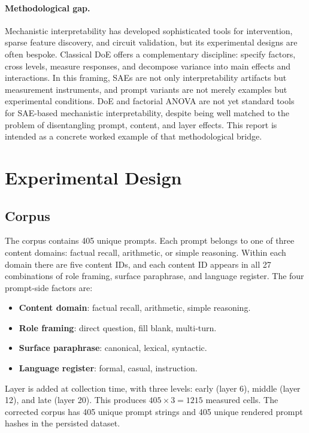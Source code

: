 \documentclass[11pt]{article}
\begin{document}
\paragraph{Methodological gap.}
Mechanistic interpretability has developed sophisticated tools for intervention, sparse feature discovery, and circuit validation, but its experimental designs are often bespoke. Classical DoE offers a complementary discipline: specify factors, cross levels, measure responses, and decompose variance into main effects and interactions. In this framing, SAEs are not only interpretability artifacts but measurement instruments, and prompt variants are not merely examples but experimental conditions. DoE and factorial ANOVA are not yet standard tools for SAE-based mechanistic interpretability, despite being well matched to the problem of disentangling prompt, content, and layer effects. This report is intended as a concrete worked example of that methodological bridge.

\section{Experimental Design}

\subsection{Corpus}

The corpus contains 405 unique prompts. Each prompt belongs to one of three content domains: factual recall, arithmetic, or simple reasoning. Within each domain there are five content IDs, and each content ID appears in all 27 combinations of role framing, surface paraphrase, and language register. The four prompt-side factors are:

\begin{itemize}
    \item \textbf{Content domain}: factual recall, arithmetic, simple reasoning.
    \item \textbf{Role framing}: direct question, fill blank, multi-turn.
    \item \textbf{Surface paraphrase}: canonical, lexical, syntactic.
    \item \textbf{Language register}: formal, casual, instruction.
\end{itemize}

Layer is added at collection time, with three levels: early (layer 6), middle (layer 12), and late (layer 20). This produces $405 \times 3 = 1215$ measured cells. The corrected corpus has 405 unique prompt strings and 405 unique rendered prompt hashes in the persisted dataset.
\end{document}
